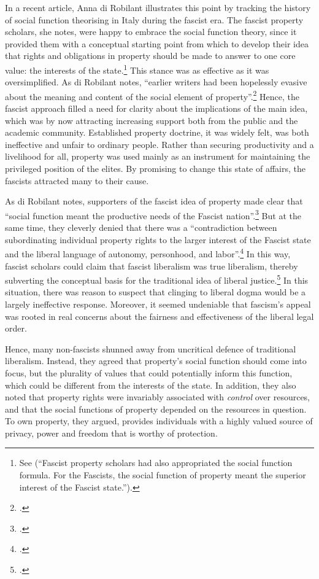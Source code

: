In a recent article, Anna di Robilant illustrates this point by tracking the history of social function theorising in Italy during the fascist era. The fascist property scholars, she notes, were happy to embrace the social function theory, since it provided them with a conceptual starting point from which to develop their idea that rights and obligations in property should be made to answer to one core value: the interests of the state.\footnote{See \cite[908-909]{robilant13} (``Fascist property scholars had also appropriated the social function formula. For the Fascists, the social function of property meant the superior interest of the Fascist state.'').} This stance was as effective as it was oversimplified. As di Robilant notes, ``earlier writers had been hopelessly evasive about the meaning and content of the social element of property''.\footcite[909]{robilant13} Hence, the fascist approach filled a need for clarity about the implications of the main idea, which was by now attracting increasing support both from the public and the academic community. Established property doctrine, it was widely felt, was both ineffective and unfair to ordinary people. Rather than securing productivity and a livelihood for all, property was used mainly as an instrument for maintaining the privileged position of the elites. By promising to change this state of affairs, the fascists attracted many to their cause.

As di Robilant notes, supporters of the fascist idea of property made clear that ``social function meant the productive needs of the Fascist nation''.\footcite[909]{robilant13} But at the same time, they cleverly denied that there was a ``contradiction between subordinating individual property rights to the larger interest of the Fascist state and the liberal language of autonomy, personhood, and labor''.\footcite[900]{robilant13} In this way, fascist scholars could claim that fascist liberalism was true liberalism, thereby subverting the conceptual basis for the traditional idea of liberal justice.\footcite[900]{robilant13} In this situation, there was reason to suspect that clinging to liberal dogma would be a largely ineffective response. Moreover, it seemed undeniable that fascism's appeal was rooted in real concerns about the fairness and effectiveness of the liberal legal order. 

Hence, many non-fascists shunned away from uncritical defence of traditional liberalism. Instead, they agreed that property's social function should come into focus, but  the plurality of values that could potentially inform this function, which could be different from the interests of the state. In addition, they also noted that property rights were invariably associated with {\it control} over resources, and that the social functions of property depended on the resources in question. To own property, they argued, provides individuals with a highly valued source of privacy, power and freedom that is worthy of protection. 

